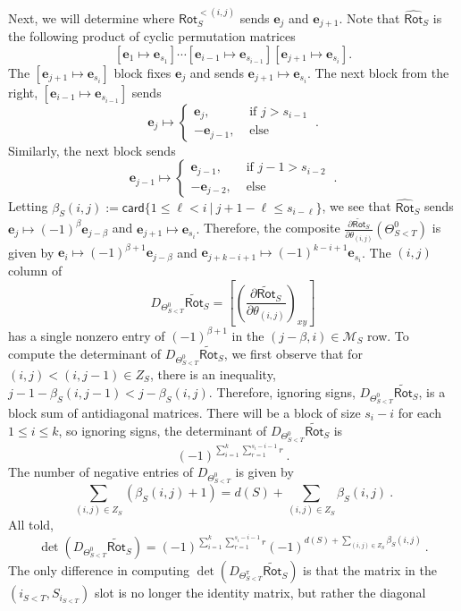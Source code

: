 \documentclass{article}
\newcommand{\mc}[1]{\mathcal{#1}}
\newcommand{\msf}[1]{\mathsf{#1}}
\newcommand{\mbf}[1]{\mathbf{#1}}
\newcommand{\rot}{\msf{Rot}}
\newcommand{\trot}{\widetilde{\msf{Rot}}}
\newcommand{\card}{\msf{card}}
\newcommand{\e}{\mbf{e}}
\theoremstyle{definition}
\begin{document}
Next, we will determine where $\msf{Rot}^{<(i,j)}_S$ sends $\e_j$ and $\e_{j+1}$. Note that
$\widehat{\rot}_S$ is the following product of cyclic permutation matrices
$$[\e_1 \mapsto \e_{s_1}] \cdots [\e_{i-1} \mapsto \e_{s_{i-1}}] [\e_{j+1} \mapsto \e_{s_i}].$$
The $[\e_{j+1} \mapsto \e_{s_i}]$ block fixes $\e_j$ and sends $\e_{j+1} \mapsto \e_{s_i}$. The next block from
the right, $[\e_{i-1} \mapsto \e_{s_{i-1}}]$ sends
$$\e_j \mapsto \begin{cases} \e_j, &\text{ if } j>s_{i-1} \\
                                                -\e_{j-1}, &\text{ else}
                         \end{cases}~.$$
Similarly, the next block sends 
$$\e_{j-1} \mapsto \begin{cases} \e_{j-1}, &\text{ if } j-1>s_{i-2} \\
                                                -\e_{j-2}, &\text{ else}
                         \end{cases}~.$$
Letting $\beta_S(i,j):= \card\{1 \le \ell <i ~|~ j+1-\ell \le s_{i-\ell}\}$, we see that $\widehat{\rot}_S$ sends
$\e_j \mapsto (-1)^\beta \e_{j-\beta}$ and $\e_{j+1} \mapsto \e_{s_i}.$ Therefore, the composite
$\frac{\partial{\trot_S}}{\partial \theta_{(i,j)}}(\Theta_{S<T}^0)$ is given by
$\e_i \mapsto (-1)^{\beta+1} \e_{j-\beta}$ and $\e_{j+k-i+1} \mapsto (-1)^{k-i+1} \e_{s_i}$. The $(i,j)$
column of
$$D_{\Theta^0_{S<T}} \trot_S = \left[ \left(\frac{\partial{\trot_S}}{\partial \theta_{(i,j)}}\right)_{xy} \right]$$
has a single nonzero entry of $(-1)^{\beta+1}$ in the $(j-\beta, i) \in \mc{M}_S$ row. To compute the
determinant of $D_{\Theta^0_{S<T}} \trot_S$, we first observe that for $(i,j)<(i,j-1) \in Z_S$, there is an inequality, 
$j-1-\beta_S(i,j-1)<j-\beta_S(i,j)$. Therefore, ignoring signs, $D_{\Theta^0_{S<T}} \trot_S$, is a block sum of 
antidiagonal matrices. There will be a block of size $s_i-i$ for each $1 \le i \le k$, so ignoring signs, the determinant
of $D_{\Theta^0_{S<T}}\trot_S$ is
$$(-1)^{\sum\limits_{i=1}^k\sum\limits_{r=1}^{s_i-i-1} r}~.$$
The number of negative entries of $D_{\Theta^0_{S<T}}$ is given by
$$\sum\limits_{(i,j)\in Z_S} (\beta_S(i,j)+1) = d(S) + \sum\limits_{(i,j)\in Z_S} \beta_S(i,j)~.$$
All told,
$$\det(D_{\Theta^0_{S<T}}\trot_S) = (-1)^{\sum\limits_{i=1}^k\sum\limits_{r=1}^{s_i-i-1} r}
    (-1)^{d(S)+ \sum\limits_{(i,j)\in Z_S} \beta_S(i,j)}~.$$
The only difference in computing $\det(D_{\Theta^\pi_{S<T}}\trot_S)$ 
is that the matrix in the $(i_{S<T},S_{i_{S<T}})$ slot is no longer the identity matrix, but rather the diagonal 
\end{document}
